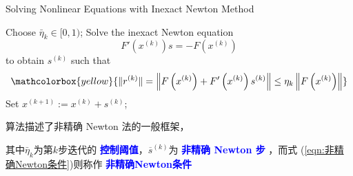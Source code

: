 \documentclass{lzureport}
\begin{document}
\begin{algorithm}
\caption{Solving Nonlinear Equations with Inexact Newton Method}
\begin{algorithmic}[1]
    \State Choose $\bar{\eta}_k \in [0, 1)$;
    \State Solve the inexact Newton equation
    \begin{equation}
        F'\left( x^{(k)} \right) s = -F\left( x^{(k)} \right)
    \end{equation}
    to obtain $s^{(k)}$ such that
    \begin{equation}\label{eqn:非精确Newton条件}
        \mathcolorbox{yellow}{\|r^{(k)}\| = \left\| F\left( x^{(k)} \right) + F'\left( x^{(k)} \right) s^{(k)} \right\| \leq \eta_k \left\| F\left( x^{(k)} \right) \right\|}
    \end{equation}
    \State Set $x^{(k+1)} := x^{(k)} + s^{(k)}$;
\EndFor
\end{algorithmic}
\end{algorithm}

算法描述了非精确 Newton 法的一般框架，

其中$\bar{\eta}_k$为第$k$步迭代的 \textcolor{blue}{\textbf{控制阈值}}，$\overline{s}^{(k)}$为 \textcolor{blue}{\textbf{非精确 Newton 步}} ，而式 (\ref{eqn:非精确Newton条件})则称作 \textcolor{blue}{\textbf{非精确Newton条件}}
\end{document}
